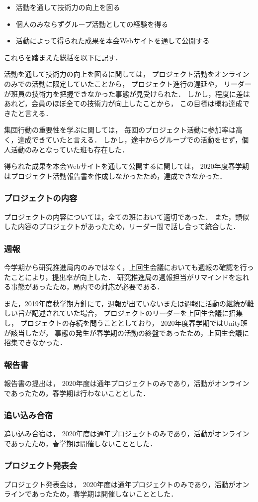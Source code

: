 \begin{itemize}
\item 活動を通して技術力の向上を図る
\item 個人のみならずグループ活動としての経験を得る
\item 活動によって得られた成果を本会Webサイトを通して公開する
\end{itemize}

これらを踏まえた総括を以下に記す．

活動を通して技術力の向上を図るに関しては，
プロジェクト活動をオンラインのみでの活動に限定していたことから，
プロジェクト進行の遅延や，
リーダーが班員の技術力を把握できなかった事態が見受けられた．
しかし，程度に差はあれど，会員のほぼ全ての技術力が向上したことから，
この目標は概ね達成できたと言える．

集団行動の重要性を学ぶに関しては，
毎回のプロジェクト活動に参加率は高く，達成できていたと言える．
しかし，途中からグループでの活動をせず，個人活動のみとなっていた班も存在した．

得られた成果を本会Webサイトを通して公開するに関しては，
2020年度春学期はプロジェクト活動報告書を作成しなかったため，達成できなかった．

\subsubsection*{プロジェクトの内容}
プロジェクトの内容については，全ての班において適切であった．
また，類似した内容のプロジェクトがあったため，リーダー間で話し合って統合した．

\subsubsection*{週報}
今学期から研究推進局内のみではなく，上回生会議においても週報の確認を行ったことにより，提出率が向上した．
研究推進局の週報担当がリマインドを忘れる事態があったため，局内での対応が必要である．

また，2019年度秋学期方針にて，週報が出ていないまたは週報に活動の継続が難しい旨が記述されていた場合，
プロジェクトのリーダーを上回生会議に招集し，
プロジェクトの存続を問うこととしており，
2020年度春学期ではUnity班が該当したが，
事態の発生が春学期の活動の終盤であったため，上回生会議に招集できなかった．

\subsubsection*{報告書}

報告書の提出は，
2020年度は通年プロジェクトのみであり，活動がオンラインであったため，春学期は行わないこととした．

\subsubsection*{追い込み合宿}
追い込み合宿は，
2020年度は通年プロジェクトのみであり，活動がオンラインであったため，春学期は開催しないこととした．

\subsubsection*{プロジェクト発表会}
プロジェクト発表会は，
2020年度は通年プロジェクトのみであり，活動がオンラインであったため，春学期は開催しないこととした．

